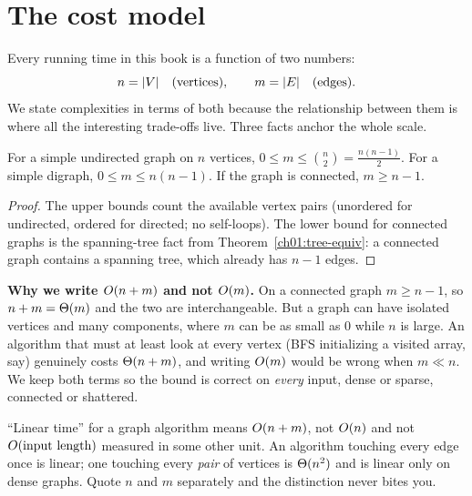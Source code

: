 \section{The cost model}
\label{ch01:costmodel}

Every running time in this book is a function of two numbers:
\[
  n = \lvert V\rvert \quad\text{(vertices)}, \qquad m = \lvert E\rvert \quad\text{(edges)}.
\]
We state complexities in terms of both because the relationship between them is
where all the interesting trade-offs live. Three facts anchor the whole scale.

\begin{proposition}
\label{ch01:edge-bounds}
For a simple undirected graph on $n$ vertices, $0 \le m \le \binom{n}{2} =
\frac{n(n-1)}{2}$. For a simple digraph, $0 \le m \le n(n-1)$. If the graph is
connected, $m \ge n-1$.
\end{proposition}

\begin{proof}
The upper bounds count the available vertex pairs (unordered for undirected,
ordered for directed; no self-loops). The lower bound for connected graphs is
the spanning-tree fact from Theorem~\ref{ch01:tree-equiv}: a connected graph
contains a spanning tree, which already has $n-1$ edges.
\end{proof}

\begin{focusbox}
\textbf{Why we write $O(n+m)$ and not $O(m)$.} On a connected graph
$m \ge n-1$, so $n + m = \Theta(m)$ and the two are interchangeable. But a graph
can have isolated vertices and many components, where $m$ can be as small as $0$
while $n$ is large. An algorithm that must at least look at every vertex (BFS
initializing a visited array, say) genuinely costs $\Theta(n+m)$, and writing
$O(m)$ would be wrong when $m \ll n$. We keep both terms so the bound is
correct on \emph{every} input, dense or sparse, connected or shattered.
\end{focusbox}

\begin{trapbox}
``Linear time'' for a graph algorithm means $O(n+m)$, not $O(n)$ and not
$O(\text{input length})$ measured in some other unit. An algorithm touching
every edge once is linear; one touching every \emph{pair} of vertices is
$\Theta(n^2)$ and is linear only on dense graphs. Quote $n$ and $m$ separately and
the distinction never bites you.
\end{trapbox}

